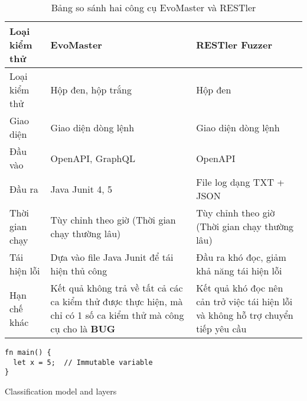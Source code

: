 \begin{table}[h]
\caption{Bảng so sánh hai công cụ EvoMaster và RESTler}
\label{table:compare2tool}
\begin{tabularx}{\textwidth}{|l|X|X|}
\hline
\textbf{Loại kiểm thử} & \textbf{EvoMaster} & \textbf{RESTler Fuzzer} \\
\hline
Loại kiểm thử & Hộp đen, hộp trắng & Hộp đen \\
\hline
Giao diện & Giao diện dòng lệnh & Giao diện dòng lệnh \\
\hline
Đầu vào & OpenAPI, GraphQL & OpenAPI \\
\hline
Đầu ra & Java Junit 4, 5 & File log dạng TXT + JSON \\
\hline
Thời gian chạy & Tùy chỉnh theo giờ
(Thời gian chạy thường lâu) & Tùy chỉnh theo giờ (Thời gian chạy thường lâu) \\
\hline
Tái hiện lỗi & Dựa vào file Java Junit để tái hiện thủ công & Đầu ra khó đọc, giảm khả năng tái hiện lỗi \\
\hline
Hạn chế khác & Kết quả không trả về tất cả các ca kiểm thử được thực hiện, mà chỉ có 1 số ca kiểm thử mà công cụ cho là \textbf{BUG} & Kết quả khó đọc nên cản trở việc tái hiện lỗi và không hỗ trợ chuyển tiếp yêu cầu \\
\hline
\end{tabularx}
\end{table}



\begin{listing}[H]
\begin{verbatim}
fn main() {
  let x = 5;  // Immutable variable
}
\end{verbatim}
\caption{Classification model and layers}
\label{fp:immutable}
\end{listing}